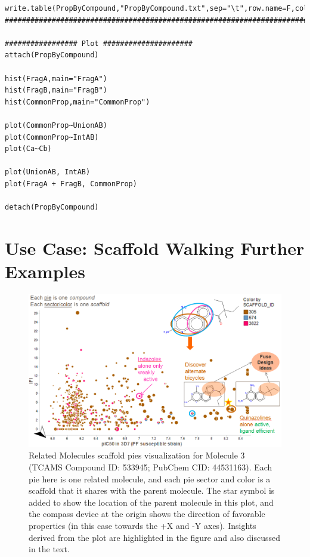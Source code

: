 \documentclass[11pt,letterpaper]{article}
\begin{document}
\begin{verbatim}
write.table(PropByCompound,"PropByCompound.txt",sep="\t",row.name=F,col.name=T)
#########################################################################################

################# Plot #####################
attach(PropByCompound)

hist(FragA,main="FragA")
hist(FragB,main="FragB")
hist(CommonProp,main="CommonProp")

plot(CommonProp~UnionAB)
plot(CommonProp~IntAB)
plot(Ca~Cb)

plot(UnionAB, IntAB)
plot(FragA + FragB, CommonProp)

detach(PropByCompound)

\end{verbatim}

\newpage 
\section{Use Case: Scaffold Walking Further Examples}\label{sec:scafwalk_eg}

\begin{figure}
\includegraphics[width=6in]{../fig/mol2_RGtool_scafpie2.png}
\caption{Related Molecules scaffold pies visualization for Molecule 3 (TCAMS Compound ID: 533945; PubChem CID: 44531163). Each pie here is one related molecule, and each pie sector and color is a scaffold that it shares with the parent molecule. The star symbol is added to show the location of the parent molecule in this plot, and the compass device at the origin shows the direction of favorable properties (in this case towards the +X and -Y axes). Insights derived from the plot are highlighted in the figure and also discussed in the text.}
\label{fig:scafwalk2}
\end{figure}
\end{document}
